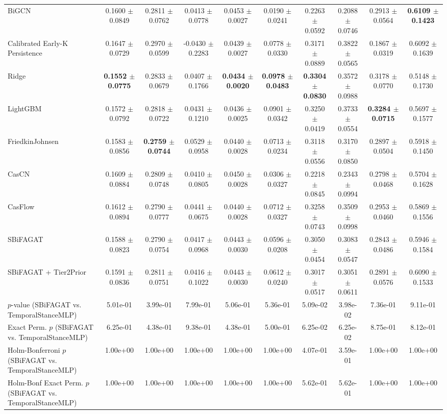 \begin{table}[t]
{\begin{tabular}{lccccccccc}
BiGCN & 0.1600 $\pm$ 0.0849 & 0.2811 $\pm$ 0.0762 & 0.0413 $\pm$ 0.0778 & 0.0453 $\pm$ 0.0027 & 0.0190 $\pm$ 0.0241 & 0.2263 $\pm$ 0.0592 & 0.2088 $\pm$ 0.0746 & 0.2913 $\pm$ 0.0564 & \textbf{0.6109 $\pm$ 0.1423} \\
Calibrated Early-K Persistence & 0.1647 $\pm$ 0.0729 & 0.2970 $\pm$ 0.0599 & -0.0430 $\pm$ 0.2283 & 0.0439 $\pm$ 0.0027 & 0.0778 $\pm$ 0.0330 & 0.3171 $\pm$ 0.0889 & 0.3822 $\pm$ 0.0565 & 0.1867 $\pm$ 0.0319 & 0.6092 $\pm$ 0.1639 \\
Ridge & \textbf{0.1552 $\pm$ 0.0775} & 0.2833 $\pm$ 0.0679 & 0.0407 $\pm$ 0.1766 & \textbf{0.0434 $\pm$ 0.0020} & \textbf{0.0978 $\pm$ 0.0483} & \textbf{0.3304 $\pm$ 0.0830} & 0.3572 $\pm$ 0.0988 & 0.3178 $\pm$ 0.0770 & 0.5148 $\pm$ 0.1730 \\
LightGBM & 0.1572 $\pm$ 0.0792 & 0.2818 $\pm$ 0.0722 & 0.0431 $\pm$ 0.1210 & 0.0436 $\pm$ 0.0025 & 0.0901 $\pm$ 0.0342 & 0.3250 $\pm$ 0.0419 & 0.3733 $\pm$ 0.0554 & \textbf{0.3284 $\pm$ 0.0715} & 0.5697 $\pm$ 0.1577 \\
FriedkinJohnsen & 0.1583 $\pm$ 0.0856 & \textbf{0.2759 $\pm$ 0.0744} & 0.0529 $\pm$ 0.0958 & 0.0440 $\pm$ 0.0028 & 0.0713 $\pm$ 0.0234 & 0.3118 $\pm$ 0.0556 & 0.3170 $\pm$ 0.0850 & 0.2897 $\pm$ 0.0504 & 0.5918 $\pm$ 0.1450 \\
CasCN & 0.1609 $\pm$ 0.0884 & 0.2809 $\pm$ 0.0748 & 0.0410 $\pm$ 0.0805 & 0.0450 $\pm$ 0.0028 & 0.0306 $\pm$ 0.0327 & 0.2218 $\pm$ 0.0845 & 0.2343 $\pm$ 0.0994 & 0.2798 $\pm$ 0.0468 & 0.5704 $\pm$ 0.1628 \\
CasFlow & 0.1612 $\pm$ 0.0894 & 0.2790 $\pm$ 0.0777 & 0.0441 $\pm$ 0.0675 & 0.0440 $\pm$ 0.0028 & 0.0712 $\pm$ 0.0327 & 0.3258 $\pm$ 0.0743 & 0.3509 $\pm$ 0.0998 & 0.2953 $\pm$ 0.0460 & 0.5869 $\pm$ 0.1556 \\
SBiFAGAT & 0.1588 $\pm$ 0.0823 & 0.2790 $\pm$ 0.0754 & 0.0417 $\pm$ 0.0968 & 0.0443 $\pm$ 0.0030 & 0.0596 $\pm$ 0.0208 & 0.3050 $\pm$ 0.0454 & 0.3083 $\pm$ 0.0547 & 0.2843 $\pm$ 0.0486 & 0.5946 $\pm$ 0.1584 \\
SBiFAGAT + Tier2Prior & 0.1591 $\pm$ 0.0836 & 0.2811 $\pm$ 0.0751 & 0.0416 $\pm$ 0.1022 & 0.0443 $\pm$ 0.0030 & 0.0612 $\pm$ 0.0240 & 0.3017 $\pm$ 0.0517 & 0.3051 $\pm$ 0.0611 & 0.2891 $\pm$ 0.0576 & 0.6090 $\pm$ 0.1533 \\
\midrule
$p$-value (SBiFAGAT vs. TemporalStanceMLP) & 5.01e-01 & 3.99e-01 & 7.99e-01 & 5.06e-01 & 5.36e-01 & 5.09e-02 & 3.98e-02 & 7.36e-01 & 9.11e-01 \\
Exact Perm. $p$ (SBiFAGAT vs. TemporalStanceMLP) & 6.25e-01 & 4.38e-01 & 9.38e-01 & 4.38e-01 & 5.00e-01 & 6.25e-02 & 6.25e-02 & 8.75e-01 & 8.12e-01 \\
Holm-Bonferroni $p$ (SBiFAGAT vs. TemporalStanceMLP) & 1.00e+00 & 1.00e+00 & 1.00e+00 & 1.00e+00 & 1.00e+00 & 4.07e-01 & 3.59e-01 & 1.00e+00 & 1.00e+00 \\
Holm-Bonf Exact Perm. $p$ (SBiFAGAT vs. TemporalStanceMLP) & 1.00e+00 & 1.00e+00 & 1.00e+00 & 1.00e+00 & 1.00e+00 & 5.62e-01 & 5.62e-01 & 1.00e+00 & 1.00e+00 \\
\bottomrule
\end{tabular}
}
\end{table}
